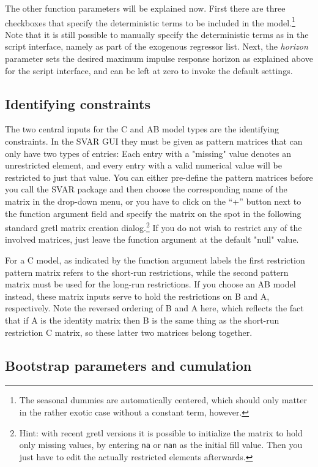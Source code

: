 \documentclass[a4paper,10pt]{article}
\newcommand{\app}[1]{\textsf{#1}}
\newcounter{script}[section]
\begin{document}
The other function parameters will be explained now. First there are
three checkboxes that specify the deterministic terms to be included
in the model.\footnote{The seasonal dummies are automatically
  centered, which should only matter in the rather exotic case without
  a constant term, however.} Note that it is still possible to
manually specify the deterministic terms as in the script interface,
namely as part of the exogenous regressor list. Next, the
\emph{horizon} parameter sets the desired maximum impulse response
horizon as explained above for the script interface, and can be left
at zero to invoke the default settings.

\subsection{Identifying constraints}

The two central inputs for the C and AB model types are the
identifying constraints. In the SVAR GUI they must be given as pattern
matrices that can only have two types of entries: Each entry with a
"missing" value denotes an unrestricted element, and every entry with
a valid numerical value will be restricted to just that value. You can
either pre-define the pattern matrices before you call the SVAR
package and then choose the corresponding name of the matrix in the
drop-down menu, or you have to click on the ``+'' button next to the
function argument field and specify the matrix on the spot in the
following standard \app{gretl} matrix creation dialog.\footnote{Hint:
  with recent gretl versions it is possible to initialize the matrix
  to hold only missing values, by entering \texttt{na} or \texttt{nan}
  as the initial fill value. Then you just have to edit the actually
  restricted elements afterwards.} If you do not wish to restrict any
of the involved matrices, just leave the function argument at the
default "null" value.

For a C model, as indicated by the function argument labels the first
restriction pattern matrix refers to the short-run restrictions, while
the second pattern matrix must be used for the long-run
restrictions. If you choose an AB model instead, these matrix inputs
serve to hold the restrictions on B and A, respectively. Note the
reversed ordering of B and A here, which reflects the fact that if A
is the identity matrix then B is the same thing as the short-run
restriction C matrix, so these latter two matrices belong together.

\subsection{Bootstrap parameters and cumulation}
\end{document}
